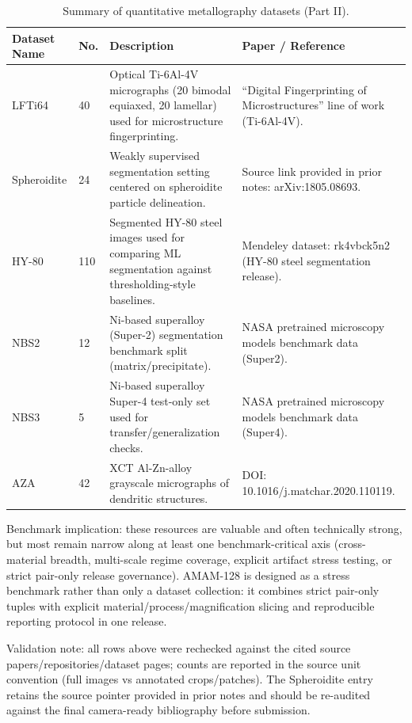 \documentclass{article}
\begin{document}
\begin{table}[ht]
    \centering
    \scriptsize
    \caption{Summary of quantitative metallography datasets (Part II).}
    \label{tab:benchmark_landscape_part2}
    \setlength{\tabcolsep}{3pt}
    \renewcommand{\arraystretch}{1.05}
    \begin{tabularx}{\textwidth}{p{}p{}X X}
        \toprule
        Dataset Name & No. & Description & Paper / Reference \\
        \midrule
        LFTi64 & 40 & Optical Ti-6Al-4V micrographs (20 bimodal equiaxed, 20 lamellar) used for microstructure fingerprinting. & ``Digital Fingerprinting of Microstructures'' line of work (Ti-6Al-4V). \\
        Spheroidite & 24 & Weakly supervised segmentation setting centered on spheroidite particle delineation. & Source link provided in prior notes: arXiv:1805.08693. \\
        HY-80 & 110 & Segmented HY-80 steel images used for comparing ML segmentation against thresholding-style baselines. & Mendeley dataset: rk4vbck5n2 (HY-80 steel segmentation release). \\
        NBS2 & 12 & Ni-based superalloy (Super-2) segmentation benchmark split (matrix/precipitate). & NASA pretrained microscopy models benchmark data (Super2). \\
        NBS3 & 5 & Ni-based superalloy Super-4 test-only set used for transfer/generalization checks. & NASA pretrained microscopy models benchmark data (Super4). \\
        AZA & 42 & XCT Al-Zn-alloy grayscale micrographs of dendritic structures. & DOI: 10.1016/j.matchar.2020.110119. \\
        \bottomrule
    \end{tabularx}
\end{table}

Benchmark implication: these resources are valuable and often technically strong, but most remain narrow along at least one benchmark-critical axis (cross-material breadth, multi-scale regime coverage, explicit artifact stress testing, or strict pair-only release governance). AMAM-128 is designed as a stress benchmark rather than only a dataset collection: it combines strict pair-only tuples with explicit material/process/magnification slicing and reproducible reporting protocol in one release.

Validation note: all rows above were rechecked against the cited source papers/repositories/dataset pages; counts are reported in the source unit convention (full images vs annotated crops/patches). The Spheroidite entry retains the source pointer provided in prior notes and should be re-audited against the final camera-ready bibliography before submission.
\end{document}

